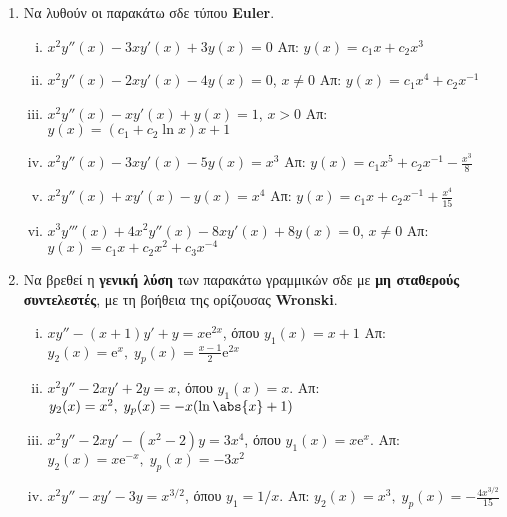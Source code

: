 \documentclass[a4paper,table]{report}
\begin{document}
\begin{enumerate}
  \item Να λυθούν οι παρακάτω σδε τύπου \textlatin{\textbf{Euler}.}
    \begin{enumerate}[i)]
      \item $ x^{2}y''(x)-3xy'(x)+3y(x)=0 $ \hfill Απ: $ y(x)=c_{1}x + c_{2}x^{3} $
      \item $ x^{2}y''(x)-2xy'(x)-4y(x)=0 $,\; $ x \neq 0 $ \hfill Απ: $
        y(x)=c_{1}x^{4}+ c_{2} x^{-1} $ 
      \item $ x^{2}y''(x)-xy'(x)+y(x)=1 $,\; $ x>0 $ \hfill Απ: $ y(x)=(c_{1}+c_{2}
        \ln{x})x + 1 $  
      \item $ x^{2}y''(x)-3xy'(x)-5y(x)=x^{3} $ \hfill Απ: $ y(x)=c_{1}x^{5}+ c_{2}
        x^{-1}- \frac{x^{3}}{8} $ 
      \item $ x^{2}y''(x)+xy'(x)-y(x)=x^{4} $ \hfill Απ: $ y(x)=c_{1}x+c_{2}x^{-1}+
        \frac{x^{4}}{15} $ 
      \item $ x^{3}y'''(x)+4x^{2}y''(x)-8xy'(x)+8y(x)=0 $,\; $ x \neq 0 $ \hfill Απ:
        $y(x)=c_{1}x+c_{2}x^{2}+c_{3}x^{-4}$ 
    \end{enumerate}

  \item Να βρεθεί η \textbf{γενική λύση} των παρακάτω γραμμικών σδε με \textbf{μη
    σταθερούς συντελεστές}, με τη βοήθεια της ορίζουσας \textlatin{\textbf{Wronski}}.

    \begin{enumerate}[i)] %
      \item $ xy''-(x+1)y'+y=x \mathrm{e}^{2x} $, όπου $ y_{1}(x)= x+1 $
        \hfill Απ: $ y_{2}(x) = \mathrm{e}^{x} , \; y_{p}(x)= \frac{x-1}{2}
        \mathrm{e}^{2x} $ 

      \item $ x^{2}y''-2xy'+2y=x $, όπου $ y_{1}(x) = x $. 
        \hfill Απ: $ y_{2}(x) = x^{2}, \; y_{p}(x) = -x(\ln{\abs{x}} +1) $ 

      \item $ x^{2}y''-2xy'-(x^{2}-2)y=3x^{4} $, όπου $ y_{1}(x)=x \mathrm{e}^{x} $.
        \hfill Απ: $ y_{2}(x)=x \mathrm{e}^{-x} , \; y_{p}(x)=-3 x^{2} $ 

      \item $ x^{2}y''-xy'-3y=x^{3/2} $, όπου $ y_{1}= {1}/{x} $. 
        \hfill Απ: $ y_{2}(x)=x^{3}, \; y_{p}(x) = - \frac{4x^{3/2}}{15} $ 

    \end{enumerate}

\end{enumerate}
\end{document}
